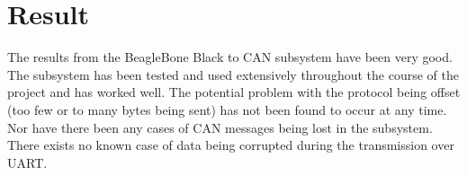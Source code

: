 
\section{Result}\label{sec:result}
The results from the BeagleBone Black to CAN subsystem have been very good. The subsystem has been tested and used extensively throughout the course of the project and has worked well. \newline
The potential problem with the protocol being offset (too few or to many bytes being sent) has not been found to occur at any time. Nor have there been any cases of CAN messages being lost in the subsystem. \newline
There exists no known case of data being corrupted during the transmission over UART.
